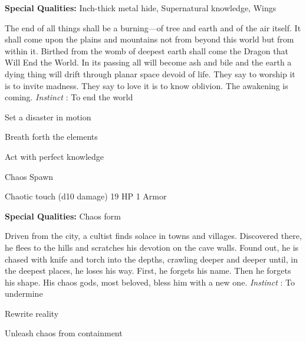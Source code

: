 
       
\startMonsterQualities
         {\bf Special Qualities:}  Inch-thick metal hide, Supernatural knowledge, Wings
\stopMonsterQualities
       
\startMonsterDescription
The end of all things shall be a burning—of tree and earth and of the air itself. It shall come upon the plains and mountains not from beyond this world but from within it. Birthed from the womb of deepest earth shall come the Dragon that Will End the World. In its passing all will become ash and bile and the earth a dying thing will drift through planar space devoid of life. They say to worship it is to invite madness. They say to love it is to know oblivion. The awakening is coming. {\em Instinct} : To end the world
\stopMonsterDescription
       
\startitemize[1,packed]
         
\item Set a disaster in motion

         
\item Breath forth the elements

         
\item Act with perfect knowledge

       
\stopitemize
       
\startMonsterName
Chaos Spawn	 
\stopMonsterName
       

Chaotic touch (d10 damage)	19 HP	1 Armor

       


       
\startMonsterQualities
         {\bf Special Qualities:}  Chaos form
\stopMonsterQualities
       
\startMonsterDescription
Driven from the city, a cultist finds solace in towns and villages. Discovered there, he flees to the hills and scratches his devotion on the cave walls. Found out, he is chased with knife and torch into the depths, crawling deeper and deeper until, in the deepest places, he loses his way. First, he forgets his name. Then he forgets his shape. His chaos gods, most beloved, bless him with a new one. {\em Instinct} : To undermine
\stopMonsterDescription
       
\startitemize[1,packed]
         
\item Rewrite reality

         
\item Unleash chaos from containment

